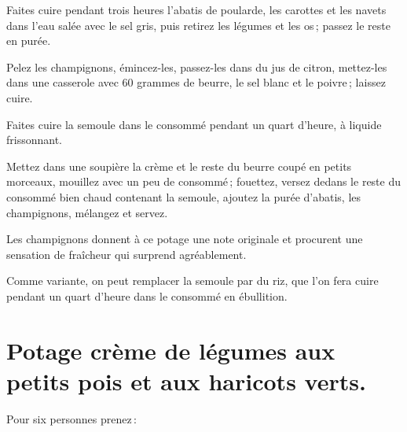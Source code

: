 Faites cuire pendant trois heures l'abatis de poularde, les carottes et les
navets dans l'eau salée avec le sel gris, puis retirez les légumes et les os ;
passez le reste en purée.

Pelez les champignons, émincez-les, passez-les dans du jus de citron,
mettez-les dans une casserole avec 60 grammes de beurre, le sel blanc et le
poivre ; laissez cuire.

Faites cuire la semoule dans le consommé pendant un quart d'heure, à liquide
frissonnant.

Mettez dans une soupière la crème et le reste du beurre coupé en petits
morceaux, mouillez avec un peu de consommé ; fouettez, versez dedans le reste
du consommé bien chaud contenant la semoule, ajoutez la purée d'abatis, les
champignons, mélangez et servez.

Les champignons donnent à ce potage une note originale et procurent une
sensation de fraîcheur qui surprend agréablement.

\sk

Comme variante, on peut remplacer la semoule par du riz, que l'on fera cuire
pendant un quart d'heure dans le consommé en ébullition.

\section*{\centering Potage crème de légumes aux petits pois et aux haricots verts.}

Pour six personnes prenez :

\medskip

